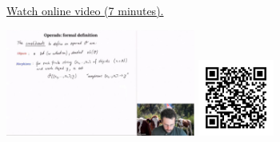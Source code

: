 
\begin{minipage}{10cm}
    \href{https://act4e-spring21.netlify.app/videos/spring2021-operads-a:operad-def.html}{Watch online video (7 minutes).}
        
    \href{https://act4e-spring21.netlify.app/videos/spring2021-operads-a:operad-def.html}{\includegraphics[height=3.5cm]{spring2021-operads-a:operad-def/thumbnails.jpg}}
    \href{https://act4e-spring21.netlify.app/videos/spring2021-operads-a:operad-def.html}{\includegraphics[height=2.5cm]{spring2021-operads-a:operad-def/qrcode.png}}
\end{minipage}
